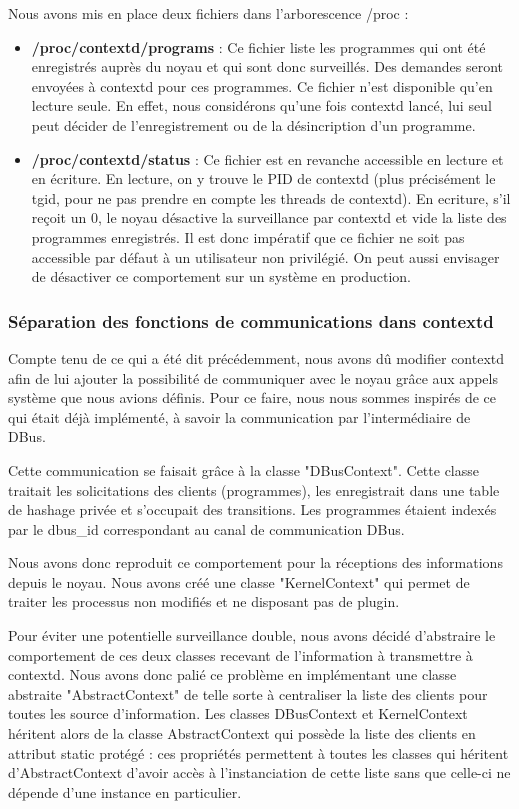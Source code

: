 \documentclass[pdftex,a4paper,titlepage,11pt]{article}
\begin{document}
Nous avons mis en place deux fichiers dans l'arborescence /proc :

	\begin{itemize}
		\item \textbf{/proc/contextd/programs} : Ce fichier liste les programmes qui ont été enregistrés auprès du noyau et qui sont donc surveillés. Des demandes seront envoyées à contextd pour ces programmes. Ce fichier n'est disponible qu'en lecture seule. En effet, nous considérons qu'une fois contextd lancé, lui seul peut décider de l'enregistrement ou de la désincription d'un programme.
		\item \textbf{/proc/contextd/status} : Ce fichier est en revanche accessible en lecture et en écriture. En lecture, on y trouve le PID de contextd (plus précisément le tgid, pour ne pas prendre en compte les threads de contextd). En ecriture, s'il reçoit un 0, le noyau désactive la surveillance par contextd et vide la liste des programmes enregistrés. Il est donc impératif que ce fichier ne soit pas accessible par défaut à un utilisateur non privilégié. On peut aussi envisager de désactiver ce comportement sur un système en production.
	\end{itemize}

\subsubsection{Séparation des fonctions de communications dans contextd}

Compte tenu de ce qui a été dit précédemment, nous avons dû modifier contextd afin de lui ajouter la possibilité de communiquer avec le noyau grâce aux appels système que nous avions définis. Pour ce faire, nous nous sommes inspirés de ce qui était déjà implémenté, à savoir la communication par l'intermédiaire de DBus.

Cette communication se faisait grâce à la classe "DBusContext". Cette classe traitait les solicitations des clients (programmes), les enregistrait dans une table de hashage privée et s'occupait des transitions. Les programmes étaient indexés par le dbus\_id correspondant au canal de communication DBus.

Nous avons donc reproduit ce comportement pour la réceptions des informations depuis le noyau. Nous avons créé une classe "KernelContext" qui permet de traiter les processus non modifiés et ne disposant pas de plugin.

Pour éviter une potentielle surveillance double, nous avons décidé d'abstraire le comportement de ces deux classes recevant de l'information à transmettre à contextd. Nous avons donc palié ce problème en implémentant une classe abstraite "AbstractContext" de telle sorte à centraliser la liste des clients pour toutes les source d'information. Les classes DBusContext et KernelContext héritent alors de la classe AbstractContext qui possède la liste des clients en attribut static protégé : ces propriétés permettent à toutes les classes qui héritent d'AbstractContext d'avoir accès à l'instanciation de cette liste sans que celle-ci ne dépende d'une instance en particulier.
\end{document}
